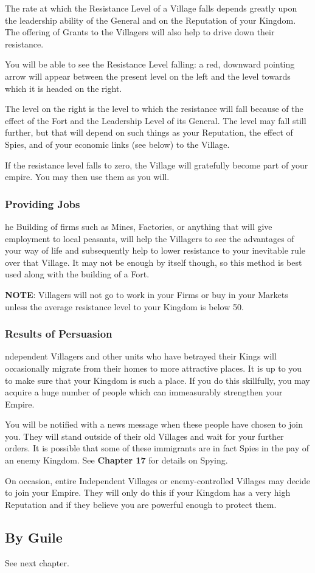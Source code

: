 The rate at which the Resistance Level of a Village falls depends greatly upon the leadership ability of the General and on the Reputation of your Kingdom. The offering of Grants to the Villagers will also help to drive down their resistance.

You will be able to see the Resistance Level falling: a red, downward pointing arrow will appear between the present level on the left and the level towards which it is headed on the right.

The level on the right is the level to which the resistance will fall because of the effect of the Fort and the Leadership Level of its General. The level may fall still further, but that will depend on such things as your Reputation, the effect of Spies, and of your economic links (see below) to the Village.

If the resistance level falls to zero, the Village will gratefully become part of your empire. You may then use them as you will.

\subsubsection{\textsf{Providing Jobs}}

he Building of firms such as Mines, Factories, or anything that will give employment to local peasants, will help the Villagers to see the advantages of your way of life and subsequently help to lower resistance to your inevitable rule over that Village. It may not be enough by itself though, so this method is best used along with the building of a Fort.

\textbf{NOTE}: Villagers will not go to work in your Firms or buy in your Markets unless the average resistance level to your Kingdom is below 50. 

\subsubsection{\textsf{Results of Persuasion}}

ndependent Villagers and other units who have betrayed their Kings will occasionally migrate from their homes to more attractive places. It is up to you to make sure that your Kingdom is such a place. If you do this skillfully, you may acquire a huge number of people which can immeasurably strengthen your Empire.

You will be notified with a news message when these people have chosen to join you. They will stand outside of their old Villages and wait for your further orders. It is possible that some of these immigrants are in fact Spies in the pay of an enemy Kingdom. See \textbf{Chapter 17} for details on Spying.

On occasion, entire Independent Villages or enemy-controlled Villages may decide to join your Empire. They will only do this if your Kingdom has a very high Reputation and if they believe you are powerful enough to protect them.

\subsection{\textsf{By Guile}}

See next chapter.
